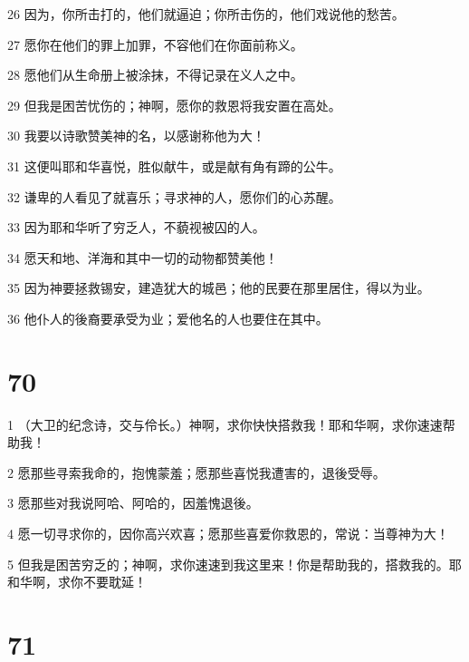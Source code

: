 \par 26 因为，你所击打的，他们就逼迫；你所击伤的，他们戏说他的愁苦。
\par 27 愿你在他们的罪上加罪，不容他们在你面前称义。
\par 28 愿他们从生命册上被涂抹，不得记录在义人之中。
\par 29 但我是困苦忧伤的；神啊，愿你的救恩将我安置在高处。
\par 30 我要以诗歌赞美神的名，以感谢称他为大！
\par 31 这便叫耶和华喜悦，胜似献牛，或是献有角有蹄的公牛。
\par 32 谦卑的人看见了就喜乐；寻求神的人，愿你们的心苏醒。
\par 33 因为耶和华听了穷乏人，不藐视被囚的人。
\par 34 愿天和地、洋海和其中一切的动物都赞美他！
\par 35 因为神要拯救锡安，建造犹大的城邑；他的民要在那里居住，得以为业。
\par 36 他仆人的後裔要承受为业；爱他名的人也要住在其中。

\chapter{70}

\par 1 （大卫的纪念诗，交与伶长。）神啊，求你快快搭救我！耶和华啊，求你速速帮助我！
\par 2 愿那些寻索我命的，抱愧蒙羞；愿那些喜悦我遭害的，退後受辱。
\par 3 愿那些对我说阿哈、阿哈的，因羞愧退後。
\par 4 愿一切寻求你的，因你高兴欢喜；愿那些喜爱你救恩的，常说：当尊神为大！
\par 5 但我是困苦穷乏的；神啊，求你速速到我这里来！你是帮助我的，搭救我的。耶和华啊，求你不要耽延！

\chapter{71}

